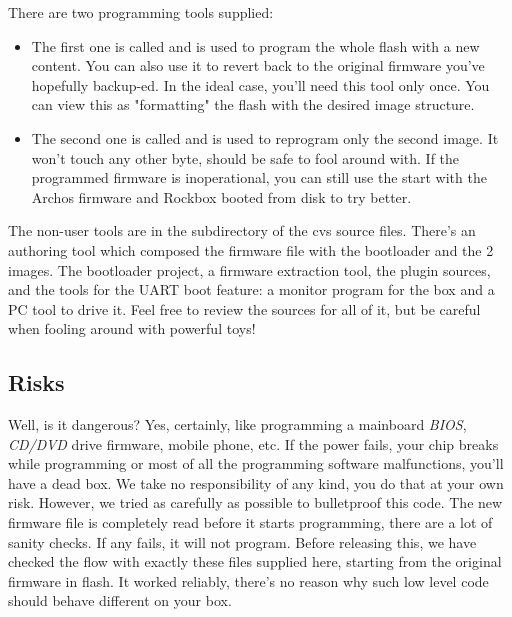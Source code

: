 
There are two programming tools supplied:

\begin{itemize}
\item The first one is called  and is used to 
  program the whole flash with a new content. You can also use it to revert 
  back to the original firmware you've hopefully backup-ed. In the ideal case, 
  you'll need this tool only once. You can view this as "formatting" the flash 
  with the desired image structure.
\item The second one is called  and is used to 
  reprogram only the second image. It won't touch any other byte, should be 
  safe to fool around with. If the programmed firmware is inoperational, you 
  can still use the  start with the Archos firmware and Rockbox booted
  from disk to try better.
\end{itemize}

The non-user tools are in the  subdirectory of the cvs source 
files. There's an authoring tool which composed the firmware file with the 
bootloader and the 2 images. The bootloader project, a firmware extraction 
tool, the plugin sources, and the tools for the UART boot feature: a monitor 
program for the box and a PC tool to drive it. Feel free to review the sources 
for all of it, but be careful when fooling around with powerful toys!

\subsection{Risks}
Well, is it dangerous? Yes, certainly, like programming a mainboard 
\emph{BIOS}, \emph{CD/DVD} drive firmware, mobile phone, etc. If the power 
fails, your chip breaks while programming or most of all the programming 
software malfunctions, you'll have a dead box. We take no responsibility of any
kind, you do that at your own risk. However, we tried as carefully as possible 
to bulletproof this code. The new firmware file is completely read before it 
starts programming, there are a lot of sanity checks. If any fails, it will not
program. Before releasing this, we have checked the flow with exactly these 
files supplied here, starting from the original firmware in flash. It worked 
reliably, there's no reason why such low level code should behave different on 
your box.

